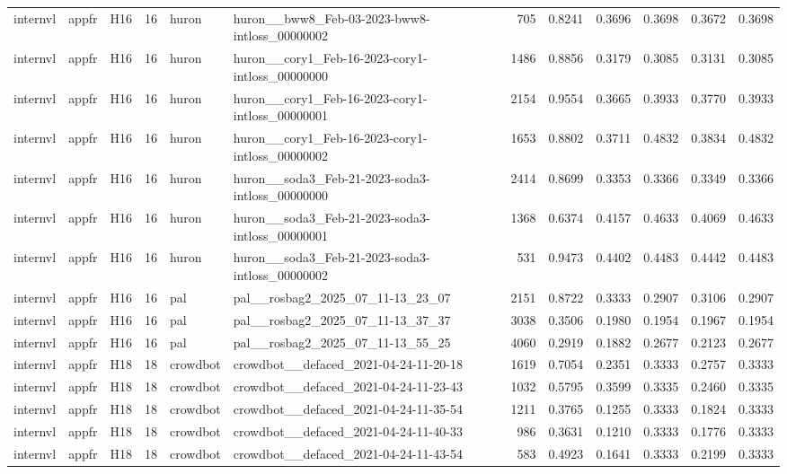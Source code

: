 \begin{table}[tbp]
\begin{tabular}{lllrllrrrrrr}
internvl & appfr & H16 & 16 & huron & huron\_\_bww8\_Feb-03-2023-bww8-intloss\_00000002 & 705 & 0.8241 & 0.3696 & 0.3698 & 0.3672 & 0.3698 \\
internvl & appfr & H16 & 16 & huron & huron\_\_cory1\_Feb-16-2023-cory1-intloss\_00000000 & 1486 & 0.8856 & 0.3179 & 0.3085 & 0.3131 & 0.3085 \\
internvl & appfr & H16 & 16 & huron & huron\_\_cory1\_Feb-16-2023-cory1-intloss\_00000001 & 2154 & 0.9554 & 0.3665 & 0.3933 & 0.3770 & 0.3933 \\
internvl & appfr & H16 & 16 & huron & huron\_\_cory1\_Feb-16-2023-cory1-intloss\_00000002 & 1653 & 0.8802 & 0.3711 & 0.4832 & 0.3834 & 0.4832 \\
internvl & appfr & H16 & 16 & huron & huron\_\_soda3\_Feb-21-2023-soda3-intloss\_00000000 & 2414 & 0.8699 & 0.3353 & 0.3366 & 0.3349 & 0.3366 \\
internvl & appfr & H16 & 16 & huron & huron\_\_soda3\_Feb-21-2023-soda3-intloss\_00000001 & 1368 & 0.6374 & 0.4157 & 0.4633 & 0.4069 & 0.4633 \\
internvl & appfr & H16 & 16 & huron & huron\_\_soda3\_Feb-21-2023-soda3-intloss\_00000002 & 531 & 0.9473 & 0.4402 & 0.4483 & 0.4442 & 0.4483 \\
internvl & appfr & H16 & 16 & pal & pal\_\_rosbag2\_2025\_07\_11-13\_23\_07 & 2151 & 0.8722 & 0.3333 & 0.2907 & 0.3106 & 0.2907 \\
internvl & appfr & H16 & 16 & pal & pal\_\_rosbag2\_2025\_07\_11-13\_37\_37 & 3038 & 0.3506 & 0.1980 & 0.1954 & 0.1967 & 0.1954 \\
internvl & appfr & H16 & 16 & pal & pal\_\_rosbag2\_2025\_07\_11-13\_55\_25 & 4060 & 0.2919 & 0.1882 & 0.2677 & 0.2123 & 0.2677 \\
internvl & appfr & H18 & 18 & crowdbot & crowdbot\_\_defaced\_2021-04-24-11-20-18 & 1619 & 0.7054 & 0.2351 & 0.3333 & 0.2757 & 0.3333 \\
internvl & appfr & H18 & 18 & crowdbot & crowdbot\_\_defaced\_2021-04-24-11-23-43 & 1032 & 0.5795 & 0.3599 & 0.3335 & 0.2460 & 0.3335 \\
internvl & appfr & H18 & 18 & crowdbot & crowdbot\_\_defaced\_2021-04-24-11-35-54 & 1211 & 0.3765 & 0.1255 & 0.3333 & 0.1824 & 0.3333 \\
internvl & appfr & H18 & 18 & crowdbot & crowdbot\_\_defaced\_2021-04-24-11-40-33 & 986 & 0.3631 & 0.1210 & 0.3333 & 0.1776 & 0.3333 \\
internvl & appfr & H18 & 18 & crowdbot & crowdbot\_\_defaced\_2021-04-24-11-43-54 & 583 & 0.4923 & 0.1641 & 0.3333 & 0.2199 & 0.3333 \\

\end{tabular}
\end{table}
